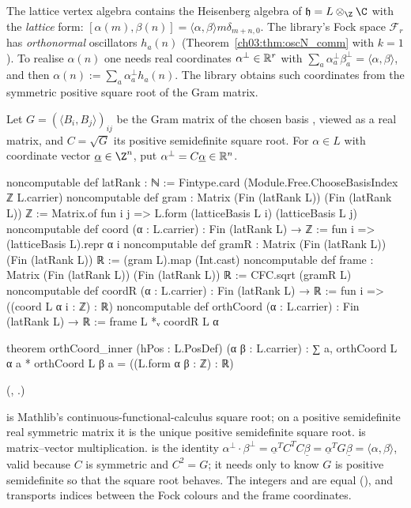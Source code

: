 The lattice vertex algebra contains the Heisenberg algebra of $\mathfrak h=L\otimes_{\Z}\C$ with the
\emph{lattice} form: $[\alpha(m),\beta(n)]=\langle\alpha,\beta\rangle m\delta_{m+n,0}$. The
library's Fock space $\mathcal F_r$ has \emph{orthonormal} oscillators $h_a(n)$
(Theorem~\ref{ch03:thm:oscN_comm} with $k=1$). To realise $\alpha(n)$ one needs real coordinates
$\alpha^{\perp}\in\mathbb{R}^r$ with $\sum_a\alpha^\perp_a\beta^\perp_a=\langle\alpha,\beta\rangle$, and then
$\alpha(n):=\sum_a\alpha^\perp_ah_a(n)$. The library obtains such coordinates from the symmetric
positive square root of the Gram matrix.

\begin{definition}\label{ch03:def:frame}
Let $G=(\langle B_i,B_j\rangle)_{ij}$ be the Gram matrix of the chosen basis
, viewed as a real matrix, and $C=\sqrt G$ its positive semidefinite square
root. For $\alpha\in L$ with coordinate vector $\underline\alpha\in\Z^n$, put
$\alpha^\perp=C\underline\alpha\in\mathbb{R}^n$.
\end{definition}
\begin{leancode}
noncomputable def latRank : ℕ := Fintype.card (Module.Free.ChooseBasisIndex ℤ L.carrier)
noncomputable def gram : Matrix (Fin (latRank L)) (Fin (latRank L)) ℤ :=
  Matrix.of fun i j => L.form (latticeBasis L i) (latticeBasis L j)
noncomputable def coord (α : L.carrier) : Fin (latRank L) → ℤ := fun i => (latticeBasis L).repr α i
noncomputable def gramR : Matrix (Fin (latRank L)) (Fin (latRank L)) ℝ :=
  (gram L).map (Int.cast)
noncomputable def frame : Matrix (Fin (latRank L)) (Fin (latRank L)) ℝ := CFC.sqrt (gramR L)
noncomputable def coordR (α : L.carrier) : Fin (latRank L) → ℝ := fun i => ((coord L α i : ℤ) : ℝ)
noncomputable def orthCoord (α : L.carrier) : Fin (latRank L) → ℝ := frame L *ᵥ coordR L α

theorem orthCoord_inner (hPos : L.PosDef) (α β : L.carrier) :
    ∑ a, orthCoord L α a * orthCoord L β a = ((L.form α β : ℤ) : ℝ)
\end{leancode}
(, .)

\begin{dictionary}
 is Mathlib's continuous-functional-calculus square root; on a positive
semidefinite real symmetric matrix it is the unique positive semidefinite square root.
 is matrix--vector multiplication.  is the identity
$\alpha^\perp\cdot\beta^\perp=\underline\alpha^TC^TC\underline\beta=\underline\alpha^TG\underline\beta
=\langle\alpha,\beta\rangle$, valid because $C$ is symmetric and $C^2=G$; it needs 
only to know $G$ is positive semidefinite so that the square root behaves. The integers
 and  are equal (), and
 transports indices between the Fock colours and
the frame coordinates.
\end{dictionary}

